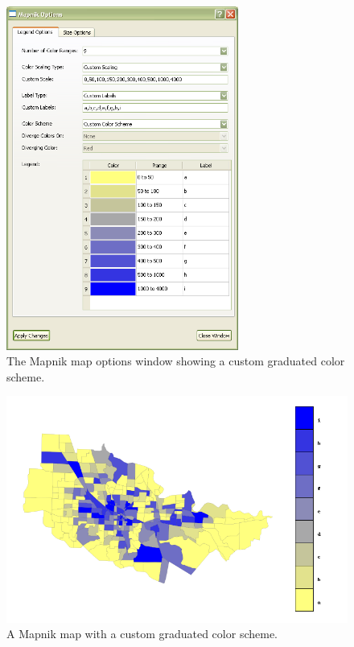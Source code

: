 \begin{figure}[htp]
\begin{center}
\includegraphics[width=3in]{part-gui/images/result-manager-mapnik-options-example-2.png}
\end{center}
\caption{The Mapnik map options window showing a custom graduated color scheme.}
\label{fig:result-manager-mapnik-options-example-2}
\end{figure}

\begin{figure}[hbp]
\begin{center}
\includegraphics[width=\textwidth]{part-gui/images/sample-map-custom-settings-2.png}
\end{center}
\caption{A Mapnik map with a custom graduated color scheme.}
\label{fig:sample-map-custom-settings-2}
\end{figure}
\clearpage

